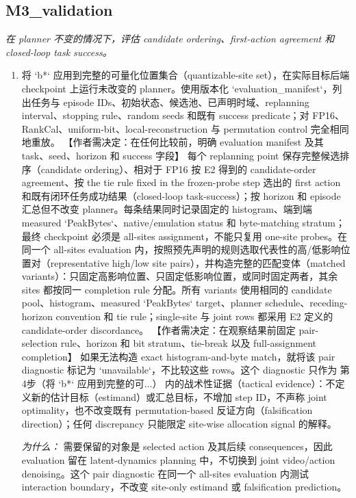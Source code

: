 \documentclass[10pt,a4paper]{article}
\begin{document}
\subsection*{M3\_validation}
\emph{在 planner 不变的情况下，评估 candidate ordering、first-action agreement 和 closed-loop task success。}
\begin{enumerate}[leftmargin=*,start=4]
  \item 将 `b*` 应用到完整的可量化位置集合（quantizable-site set），在实际目标后端 checkpoint 上运行未改变的 planner。使用版本化 `evaluation\_manifest`，列出任务与 episode IDs、初始状态、候选池、已声明时域、replanning interval、stopping rule、random seeds 和既有 success predicate；对 FP16、RankCal、uniform-bit、local-reconstruction 与 permutation control 完全相同地重放。 【作者需决定：在任何比较前，明确 evaluation manifest 及其 task、seed、horizon 和 success 字段】 每个 replanning point 保存完整候选排序（candidate ordering）、相对于 FP16 按 E2 得到的 candidate-order agreement、按 the tie rule fixed in the frozen-probe step 选出的 first action 和既有闭环任务成功结果（closed-loop task-success）；按 horizon 和 episode 汇总但不改变 planner。每条结果同时记录固定的 histogram、端到端 measured `PeakBytes`、native/emulation status 和 byte-matching stratum；最终 checkpoint 必须是 all-sites assignment，不能只复用 one-site probes。在同一个 all-sites evaluation 内，按照预先声明的规则选取代表性的高/低影响位置对（representative high/low site pairs），并构造完整的匹配变体（matched variants）：只固定高影响位置、只固定低影响位置，或同时固定两者，其余 sites 都按同一 completion rule 分配。所有 variants 使用相同的 candidate pool、histogram、measured `PeakBytes` target、planner schedule、receding-horizon convention 和 tie rule；single-site 与 joint rows 都采用 E2 定义的 candidate-order discordance。 【作者需决定：在观察结果前固定 pair-selection rule、horizon 和 bit stratum、tie-break 以及 full-assignment completion】 如果无法构造 exact histogram-and-byte match，就将该 pair diagnostic 标记为 `unavailable`，不比较这些 rows。这个 diagnostic 只作为 第4步（将 `b*` 应用到完整的可\(\dots \)） 内的战术性证据（tactical evidence）：不定义新的估计目标（estimand）或汇总目标，不增加 step ID，不声称 joint optimality，也不改变既有 permutation-based 反证方向（falsification direction）；任何 discrepancy 只能限定 site-wise allocation signal 的解释。
\par\emph{为什么：} 需要保留的对象是 selected action 及其后续 consequences，因此 evaluation 留在 latent-dynamics planning 中，不切换到 joint video/action denoising。这个 pair diagnostic 在同一个 all-sites evaluation 内测试 interaction boundary，不改变 site-only estimand 或 falsification prediction。
\end{enumerate}
\end{document}
